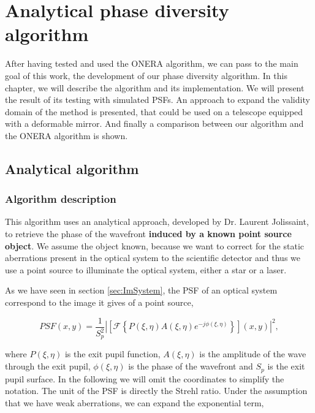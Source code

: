 \chapter{Analytical phase diversity algorithm} 
\label{ch:ourPD}

After having tested and used the ONERA algorithm, we can pass to the main goal of this work, the development of our phase diversity algorithm. In this chapter, we will describe the algorithm and its implementation. We will present the result of its testing with simulated PSFs. An approach to expand the validity domain of the method is presented, that could be used on a telescope equipped with a deformable mirror. And finally a comparison between our algorithm and the ONERA algorithm is shown.

\section{Analytical algorithm}
\label{sec:AnAlgo}

\subsection{Algorithm description}
\label{subsec:ANalgoDesc}

This algorithm uses an analytical approach, developed by Dr. Laurent Jolissaint, to retrieve the phase of the wavefront \textbf{induced by a known point source object}. We assume the object known, because we want to correct for the static aberrations present in the optical system to the scientific detector and thus we use a point source to illuminate the optical system, either a star or a laser.

As we have seen in section \ref{sec:ImSystem}, the PSF of an optical system correspond to the image it gives of a point source,

\begin{equation}
PSF(x,y) = \frac{1}{S_p^2}|\left[\mathcal{F}\left\lbrace P(\xi,\eta)A(\xi,\eta)e^{-j\phi(\xi,\eta)} \right\rbrace\right](x,y)|^2,
\label{eqt:PSF}
\end{equation}

where $P(\xi,\eta)$ is the exit pupil function, $A(\xi,\eta)$ is the amplitude of the wave through the exit pupil, $\phi(\xi,\eta)$ is the phase of the wavefront and $S_p$ is the exit pupil surface. In the following we will omit the coordinates to simplify the notation. The unit of the PSF is directly the Strehl ratio. Under the assumption that we have weak aberrations, we can expand the exponential term,

